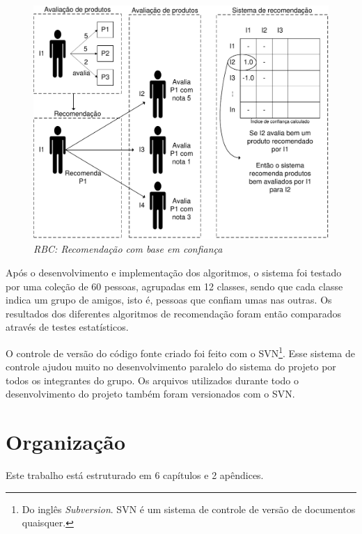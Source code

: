 \begin{figure}
  \centering
  \includegraphics[width=\textwidth]{imagens/RBC}
  \caption{\it RBC: Recomendação com base em confiança}
  \label{fig:RBC}
\end{figure}

 Após o desenvolvimento e implementação dos algoritmos, o sistema foi testado por uma coleção de 60 pessoas, agrupadas em 12 classes, sendo que cada classe indica um grupo de amigos, isto é, pessoas que confiam umas nas outras. Os resultados dos diferentes algoritmos de recomendação foram então comparados através de testes estatísticos.

 O controle de versão do código fonte criado foi feito com o SVN\footnote{Do inglês \textit{Subversion}. SVN é um sistema de controle de versão de documentos quaisquer.}. Esse sistema de controle ajudou muito no desenvolvimento paralelo do sistema do projeto por todos os integrantes do grupo. Os arquivos utilizados durante todo o desenvolvimento do projeto também foram versionados com o SVN.


\section{Organização} %

 Este trabalho está estruturado em 6 capítulos e 2 apêndices.
 

